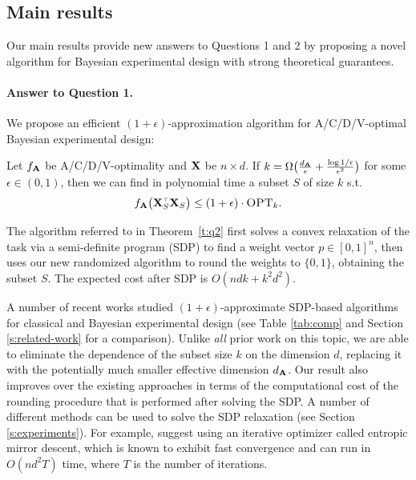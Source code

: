 \documentclass[11pt]{article}
\begin{document}
\subsection{Main results}
Our main results provide new answers to Questions 1 and 2
by proposing a novel algorithm for Bayesian experimental design with
strong theoretical guarantees.

  \paragraph{Answer to Question 1.}
We propose an efficient $(1+\epsilon)$-approximation algorithm for
A/C/D/V-optimal Bayesian  experimental design:
\begin{theorem}\label{t:q2}
  Let $f_{\mathbf A}$ be A/C/D/V-optimality and $\mathbf X$ be $n\times d$. If
  $k=\Omega\big(\frac{d_{\mathbf A}}{\epsilon} +
  \frac{\log1/\epsilon}{\epsilon^2}\big)$ for some $\epsilon\in(0,1)$, then 
we can find in polynomial time a subset $S$ of size $k$ s.t.
  \begin{align*}
    f_{\A}\big(\X_S^\top\X_S\big) \leq (1+\epsilon)\cdot\opt.
  \end{align*}
\end{theorem}
\begin{remark}
  The algorithm referred to in Theorem~\ref{t:q2} first solves a convex
  relaxation of the task via a semi-definite program (SDP) to find a
  weight vector $p\in[0,1]^n$, then uses our new randomized algorithm 
  to round the weights to $\{0,1\}$, obtaining the subset
  $S$. The expected cost after SDP is $O(ndk+k^2d^2)$.
\end{remark}

A number of recent works studied $(1+\epsilon)$-approximate SDP-based algorithms 
for classical and Bayesian experimental design (see Table
\ref{tab:comp} and Section \ref{s:related-work} for a comparison). Unlike \emph{all} prior work on
this topic, we are able to eliminate the
dependence of the subset size $k$ on the dimension $d$, replacing it
with the potentially much smaller effective dimension $d_\mathbf A$.
Our result also improves over the existing approaches in terms of the computational
cost of the rounding procedure that is performed after solving the SDP. A
number of different methods can be used to solve the SDP relaxation (see
Section \ref{s:experiments}). For
example, \cite{near-optimal-design} suggest using an iterative
optimizer called entropic mirror descent, which is known to exhibit
fast convergence and can run in $O(nd^2T)$ time, where $T$ is the
number of iterations. 
\end{document}
